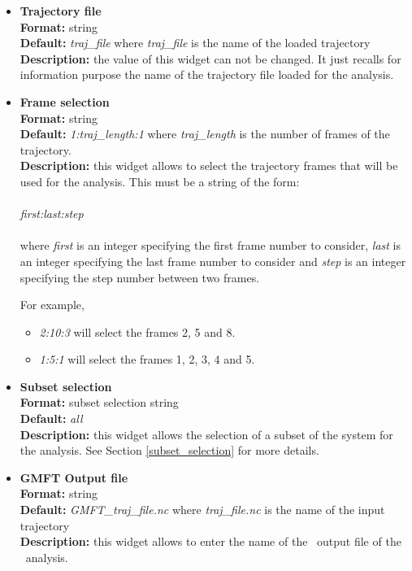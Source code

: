 \documentclass[a4paper,11pt]{report}
\begin{document}
\begin{itemize}
\item \textbf{Trajectory file}\\
\textbf{Format:} string\\
\textbf{Default:} \textit{traj\_file} where \textit{traj\_file} is the name of the loaded trajectory\\
\textbf{Description:} the value of this widget can not be changed. It just recalls for information purpose the name
of the trajectory file loaded for the analysis.

\item \textbf{Frame selection}\\
\textbf{Format:} string\\
\textbf{Default:} \textit{1:traj\_length:1} where \textit{traj\_length} is the number of frames of the trajectory.\\
\textbf{Description:} this widget allows to select the trajectory frames that will be used for the analysis. This must
be a string of the form:
\\\\
\textit{first:last:step}
\\\\
where \textit{first} is an integer specifying the first frame number to consider, \textit{last} is an integer specifying the last 
frame number to consider and \textit{step} is an integer specifying the step number between two frames.

For example,
\begin{itemize}
\item \textit{2:10:3} will select the frames 2, 5 and 8.
\item \textit{1:5:1} will select the frames 1, 2, 3, 4 and 5.
\end{itemize}

\item \textbf{Subset selection}\\
\textbf{Format:} subset selection string\\
\textbf{Default:} \textit{all}\\
\textbf{Description:} this widget allows the selection of a subset of the system for the analysis. 
See Section \ref{subset_selection} for more details.

\item \textbf{GMFT Output file}\\
\textbf{Format:} string\\
\textbf{Default:} \textit{GMFT\_traj\_file.nc} where \textit{traj\_file.nc} is the name of the input trajectory\\
\textbf{Description:} this widget allows to enter the name of the \NetCDF\ output file of the \GMFT\ analysis.
\end{itemize}
\end{document}

